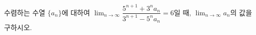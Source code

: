 수렴하는 수열 $\{a_n\}$에 대하여 $\displaystyle\lim_{n\to\infty}\dfrac{5^{n+1}+3^na_n}{3^{n+1}-5^na_n}=6$일 때, $\displaystyle\lim_{n\to\infty}a_n$의 값을 구하시오.
